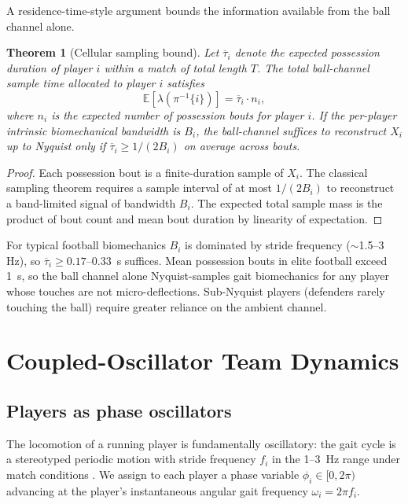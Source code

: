 \documentclass[11pt,twocolumn,a4paper]{article}
\newtheorem{theorem}{Theorem}[section]
\theoremstyle{definition}
\theoremstyle{remark}
\begin{document}
A residence-time-style argument bounds the information available from
the ball channel alone.

\begin{theorem}[Cellular sampling bound]
\label{thm:sampling}
Let $\overline{\tau}_i$ denote the expected possession duration of
player $i$ within a match of total length $T$. The total ball-channel
sample time allocated to player $i$ satisfies
\begin{equation}
  \mathbb{E}\!\left[\lambda(\pi^{-1}\{i\})\right] = \overline{\tau}_i \cdot n_i,
\end{equation}
where $n_i$ is the expected number of possession bouts for player $i$.
If the per-player intrinsic biomechanical bandwidth is $B_i$, the
ball-channel suffices to reconstruct $X_i$ up to Nyquist
\citep{shannon1948} only if $\overline{\tau}_i \geq 1/(2B_i)$ on
average across bouts.
\end{theorem}

\begin{proof}
Each possession bout is a finite-duration sample of $X_i$. The classical
sampling theorem \citep{shannon1948,cover2006} requires a sample interval
of at most $1/(2B_i)$ to reconstruct a band-limited signal of bandwidth
$B_i$. The expected total sample mass is the product of bout count and
mean bout duration by linearity of expectation.
\end{proof}

For typical football biomechanics $B_i$ is dominated by stride frequency
($\sim$1.5--3 Hz), so $\overline{\tau}_i \geq 0.17$--$0.33$~s suffices.
Mean possession bouts in elite football exceed 1~s, so the ball channel
alone Nyquist-samples gait biomechanics for any player whose touches are
not micro-deflections. Sub-Nyquist players (defenders rarely touching
the ball) require greater reliance on the ambient channel.

\section{Coupled-Oscillator Team Dynamics}
\label{sec:kuramoto}

\subsection{Players as phase oscillators}

The locomotion of a running player is fundamentally oscillatory: the
gait cycle is a stereotyped periodic motion with stride frequency
$f_i$ in the 1--3~Hz range under match conditions
\citep{novacheck1998,cavagna1977}. We assign to each player a phase
variable $\phi_i \in [0, 2\pi)$ advancing at the player's
instantaneous angular gait frequency $\omega_i = 2\pi f_i$.
\end{document}
